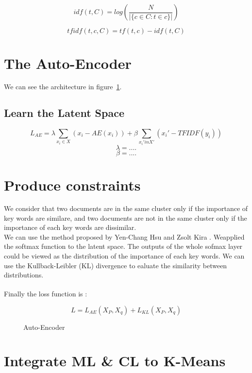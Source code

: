 \documentclass{article}
\begin{document}
\begin{equation}\label{eq:idf}
  idf(t, C) = log(\frac{N}{| \{ c \in C : t \in c \}  |})
\end{equation}

\begin{equation}\label{eq:tfidf}
  tfidf(t,c,C) = tf(t,c) - idf(t,C)
\end{equation}


\section{The Auto-Encoder}

We can see the architecture in figure~\ref{fig:archi}.

\subsection{Learn the Latent Space}
\begin{equation}\label{eq:tf-idf}
  L_{AE}= \lambda\sum_{x_i \in X} (x_i - AE(x_i)) +
  \beta\sum_{x_i' in X'} (x_i' - TFIDF(y_i))
\end{equation}
\begin{equation}\label{eq:lambda}
  \lambda = ....
\end{equation}
\begin{equation}\label{eq:beta}
  \beta = ....
\end{equation}

\section{Produce constraints}

We consider that two documents are in the same cluster only if the
importance of key words are similare, and two documents are not in the
same cluster only if the importance of each key words are dissimilar.
\\

We can use the method proposed by Yen-Chang Hsu and Zsolt Kira
\cite{2015arXiv151106321H}. Weapplied the softmax function to the
latent space. The outputs of the whole sofmax layer could be viewed as
the distribution of the importance of each key words. We can use the
Kullback-Leibler (KL) divergence to ealuate the similarity between
distributions. 
\\ \\
Finally the loss function is :

\begin{equation}\label{eq:loss_FINALE}
  L = L_{AE}(X_P, X_q) + L_{KL}(X_P, X_q)
\end{equation}

\begin{figure}[!t]
  \centering
  
  \caption{Auto-Encoder}
  \label{fig:archi}
\end{figure}

\section{Integrate ML \& CL to K-Means}

\nocite{*}
\printbibliography[title=References]
\end{document}
